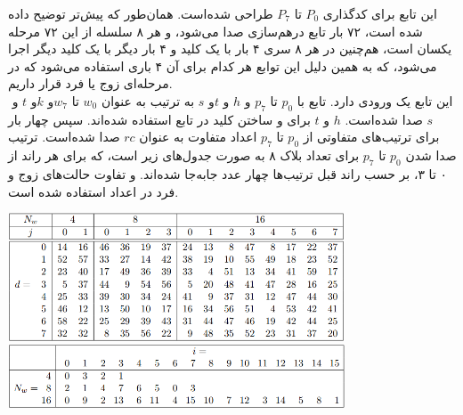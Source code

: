 این تابع برای کدگذاری $ P_0 $ تا $ P_7 $ طراحی شده‌است. همان‌طور که پیش‌تر توضیح داده شده است، ۷۲ بار تابع درهم‌سازی صدا می‌شود،‌ و هر ۸ سلسله از این ۷۲ مرحله یکسان است، هم‌چنین در هر ۸ سری ۴ بار با یک کلید و ۴ بار دیگر با یک کلید دیگر اجرا می‌شود،‌ که به همین دلیل این توابع  هر کدام برای آن ۴ باری استفاده می‌شود که در مرحله‌ای زوج یا فرد قرار داریم.
\\
این تابع یک ورودی   دارد. تابع  \hyperref[subsec:TFBIG-ADDKEY]{} با ‌$ p_0 $ تا  $ p_7 $ و $ h $ و $ t $و ‌$ s $ به ترتیب به عنوان  $ w_0 $ تا $ w_7 $و $ k $و ‌$ t $ و ‌$ s $ صدا شده‌است. ‌$ h $ و $ t $ برای  و ساختن کلید در تابع  استفاده شده‌اند.
سپس   \hyperref[subsec:TFBIG-MIX8]{}چهار بار برای ترتیب‌های متفاوتی از ‌$ p_0 $ تا $ p_7 $ اعداد متفاوت به عنوان $ rc $ صدا شده‌است. ترتیب صدا شدن $ p_0 $ تا $ p_7 $ برای تعداد بلاک ۸ به صورت جدول‌های زیر است،‌ که برای هر ‌‌راند از ۰ تا ۳، بر حسب راند قبل ترتیب‌ها چهار عدد جابه‌جا شده‌اند. و تفاوت حالت‌های زوج و فرد در اعداد استفاده شده است.
\begin{center}
	\includegraphics[width=10cm]{images/table_mix.png}
	\includegraphics[width= 10cm]{images/Mix2.png}
\end{center}


\subsection{}
\label{subsec:TFBIG-ADDKEY}

